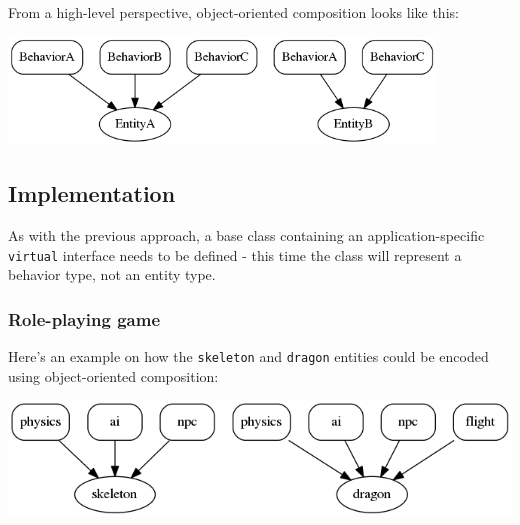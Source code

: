 \documentclass[twoside, 12pt, a4paper, openany]{book}
\let\origfigure=\figure
\let\endorigfigure=\endfigure
\renewenvironment{figure}[1][]{%
\origfigure[H]
}{%
\endorigfigure
}
\begin{document}
From a high-level perspective, object-oriented composition looks like
this:

\begin{figure}[htbp]
\centering
\includegraphics[width=0.85000\textwidth]{source/figures/generated/ecs/overview/oop_composition/example.png}
\caption{Object-oriented composition: hypotetical entity hierarchy}
\end{figure}

\subsection{Implementation}\label{implementation-1}

As with the previous approach, a base class containing an
application-specific
\texttt{virtual}
interface needs to be defined - this time the class will represent a
behavior type, not an entity type.

\subsubsection{Role-playing game}\label{role-playing-game-2}

Here's an example on how the
\texttt{skeleton}
and
\texttt{dragon}
entities could be encoded using object-oriented composition:

\begin{figure}[htbp]
\centering
\includegraphics{source/figures/generated/ecs/overview/oop_composition/example_rpg_0.png}
\caption{Object-oriented composition: RPG - skeleton and dragon}
\end{figure}
\end{document}
